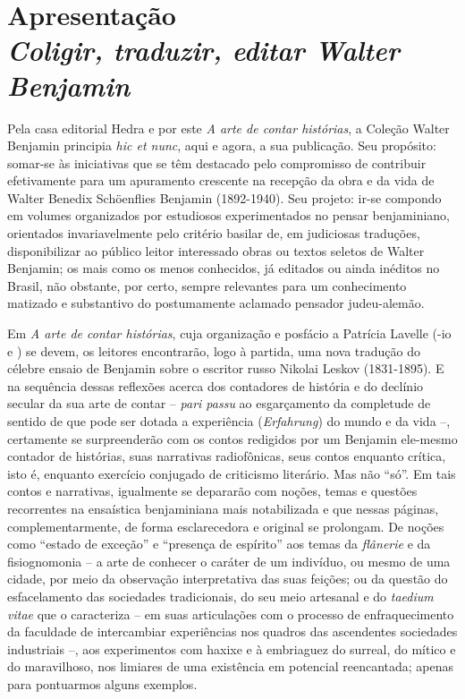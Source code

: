 \chapter*{Apresentação\\ \textit{Coligir, traduzir, editar Walter Benjamin}}


\noindent Pela casa editorial Hedra e por este \emph{A arte de contar
histórias}, a Coleção Walter Benjamin principia \emph{hic et nunc}, aqui
e agora, a sua publicação. Seu propósito: somar-se às iniciativas que se
têm destacado pelo compromisso de contribuir efetivamente para um
apuramento crescente na recepção da obra e da vida de Walter Benedix
Schöenflies Benjamin (1892-1940). Seu projeto: ir-se compondo em volumes
organizados por estudiosos experimentados no pensar benjaminiano,
orientados invariavelmente pelo critério basilar de, em judiciosas
traduções, disponibilizar ao público leitor interessado obras ou textos
seletos de Walter Benjamin; os mais como os menos conhecidos, já
editados ou ainda inéditos no Brasil, não obstante, por certo, sempre
relevantes para um conhecimento matizado e substantivo do postumamente
aclamado pensador judeu-alemão.

Em \emph{A arte de contar histórias}, cuja organização e posfácio a
Patrícia Lavelle (-io e ) se devem, os leitores encontrarão,
logo à partida, uma nova tradução do célebre ensaio de Benjamin sobre o
escritor russo Nikolai Leskov (1831-1895). E na sequência dessas
reflexões acerca dos contadores de história e do declínio secular da sua
arte de contar -- \emph{pari passu} ao esgarçamento da completude de
sentido de que pode ser dotada a experiência (\emph{Erfahrung}) do mundo
e da vida --, certamente se surpreenderão com os contos redigidos por um
Benjamin ele-mesmo contador de histórias, suas narrativas radiofônicas,
seus contos enquanto crítica, isto é, enquanto exercício conjugado de
criticismo literário. Mas não ``só''. Em tais contos e narrativas,
igualmente se depararão com noções, temas e questões recorrentes na
ensaística benjaminiana mais notabilizada e que nessas páginas,
complementarmente, de forma esclarecedora e original se prolongam. De
noções como ``estado de exceção'' e ``presença de espírito'' aos temas da \emph{flânerie} e da fisiognomonia -- a arte de conhecer o caráter de um indivíduo, ou mesmo
de uma cidade, por meio da observação interpretativa das suas feições;
ou da questão do esfacelamento das sociedades tradicionais, do seu meio
artesanal e do \emph{taedium vitae} que o caracteriza -- em suas
articulações com o processo de enfraquecimento da faculdade de
intercambiar experiências nos quadros das ascendentes sociedades
industriais --, aos experimentos com haxixe e à embriaguez do surreal,
do mítico e do maravilhoso, nos limiares de uma existência em potencial
reencantada; apenas para pontuarmos alguns exemplos.

